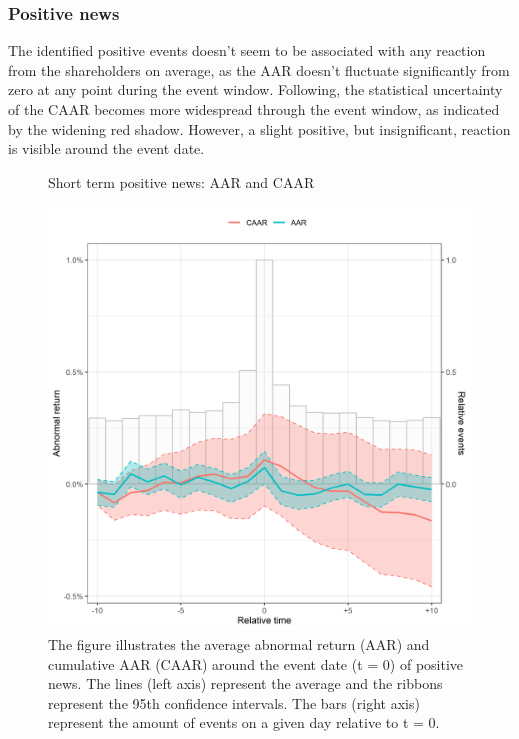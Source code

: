 \subsubsection{Positive news}

The identified positive events doesn't seem to be associated with any reaction from the shareholders on average, as the AAR doesn't fluctuate significantly from zero at any point during the event window. Following, the statistical uncertainty of the CAAR becomes more widespread through the event window, as indicated by the widening red shadow. However, a slight positive, but insignificant, reaction is visible around the event date. 

\begin{figure} [H] 
    \centering
    \caption{Short term positive news: AAR and CAAR}
    \includegraphics[scale=0.6]{Projekt/1.Figures analysis/ST_positive_all_CI.png}
    \caption*{\footnotesize The figure illustrates the average abnormal return (AAR) and cumulative AAR (CAAR) around the event date (t = 0) of positive news. The lines (left axis) represent the average and the ribbons represent the 95th confidence intervals. The bars (right axis) represent the amount of events on a given day relative to t = 0. }
    \label{fig:ST_pos_news}
\end{figure}


